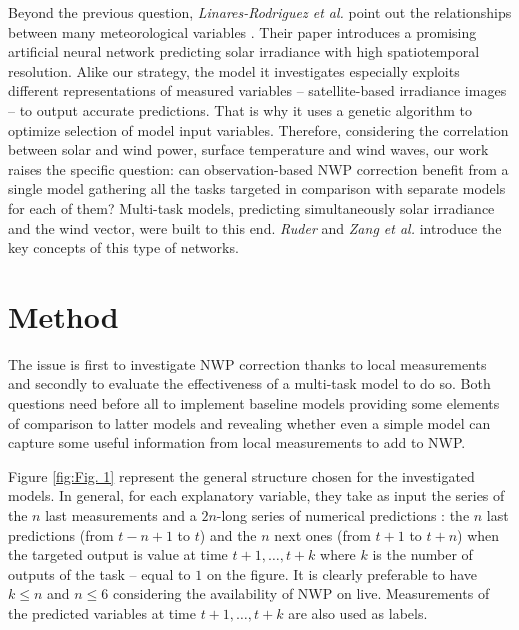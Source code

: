 \documentclass{article}
\newcommand{\saut}{\vspace{10px}}
\begin{document}
\saut

Beyond the previous question, \emph{Linares-Rodriguez et al.} point out the relationships between
many meteorological variables \cite{linares-rodriguez_artificial_2013}. Their paper introduces a promising artificial
neural network predicting solar irradiance with high spatiotemporal resolution. Alike our strategy,
the model it investigates especially exploits different representations of measured variables
-- satellite-based irradiance images -- to output accurate predictions.
That is why it uses a genetic algorithm to optimize selection of model input variables.
Therefore, considering the correlation between solar and wind power,
surface temperature and wind waves, our work raises the specific question: can
observation-based NWP correction benefit from a single model gathering all the tasks targeted in comparison with
separate models for each of them? Multi-task models, predicting simultaneously solar irradiance and the wind vector,
were built to this end. \emph{Ruder} \cite{ruder_overview_2017} and \emph{Zang et al.} \cite{zhang_overview_2018}
introduce the key concepts of this type of networks.

\section{Method}

The issue is first to investigate NWP correction thanks to local measurements and secondly to evaluate
the effectiveness of a multi-task model to do so. Both questions need before all to implement baseline models
providing some elements of comparison to latter models and revealing whether even a simple model can
capture some useful information from local measurements to add to NWP.

\saut

Figure \ref{fig:Fig. 1} represent the general structure chosen for the investigated models. In general, for each
explanatory variable, they take
as input the series of the $n$ last measurements and a $2n$-long series of numerical predictions : the $n$ last
predictions (from $t - n + 1$ to $t$) and the $n$ next ones (from $t + 1$ to $t + n$) when the targeted output is
value at time $t + 1, \dots, t + k$ where $k$ is the number of outputs of the task -- equal to $1$ on the figure.
It is clearly preferable to have $k \leq n$ and $n \leq 6$ considering the availability of NWP on live.
Measurements of the predicted variables at time $t + 1, \dots, t + k$ are also used as labels.
\end{document}
